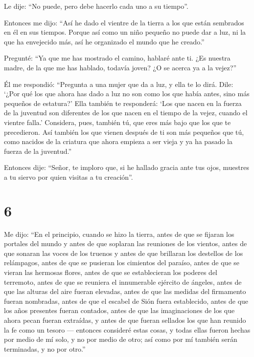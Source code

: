  Le dije: ``No puede, pero debe hacerlo cada uno a su
tiempo''.

 Entonces me dijo: ``Así he dado el vientre de la tierra
a los que están sembrados en él en sus tiempos.  Porque
así como un niño pequeño no puede dar a luz, ni la que ha envejecido
más, así he organizado el mundo que he creado.''

 Pregunté: ``Ya que me has mostrado el camino, hablaré
ante ti. ¿Es nuestra madre, de la que me has hablado, todavía joven? ¿O
se acerca ya a la vejez?''

 Él me respondió: ``Pregunta a una mujer que da a luz, y
ella te lo dirá.  Dile: `¿Por qué los que ahora has dado
a luz no son como los que había antes, sino más pequeños de estatura?'
 Ella también te responderá: `Los que nacen en la fuerza
de la juventud son diferentes de los que nacen en el tiempo de la vejez,
cuando el vientre falla.'  Considera, pues, también tú,
que eres más bajo que los que te precedieron.  Así
también los que vienen después de ti son más pequeños que tú, como
nacidos de la criatura que ahora empieza a ser vieja y ya ha pasado la
fuerza de la juventud.''

 Entonces dije: ``Señor, te imploro que, si he hallado
gracia ante tus ojos, muestres a tu siervo por quien visitas a tu
creación''.

\hypertarget{section-5}{%
\section{6}\label{section-5}}

 Me dijo: ``En el principio, cuando se hizo la tierra,
antes de que se fijaran los portales del mundo y antes de que soplaran
las reuniones de los vientos,  antes de que sonaran las
voces de los truenos y antes de que brillaran los destellos de los
relámpagos, antes de que se pusieran los cimientos del paraíso,
 antes de que se vieran las hermosas flores, antes de que
se establecieran los poderes del terremoto, antes de que se reuniera el
innumerable ejército de ángeles,  antes de que las alturas
del aire fueran elevadas, antes de que las medidas del firmamento fueran
nombradas, antes de que el escabel de Sión fuera establecido,
 antes de que los años presentes fueran contados, antes de
que las imaginaciones de los que ahora pecan fueran extraídas, y antes
de que fueran sellados los que han reunido la fe como un tesoro ---
 entonces consideré estas cosas, y todas ellas fueron
hechas por medio de mí solo, y no por medio de otro; así como por mí
también serán terminadas, y no por otro.''

